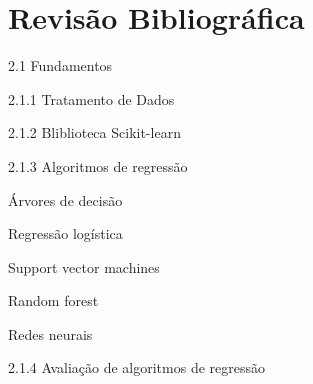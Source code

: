 

\chapter[Revisão Bibliográfica]{Revisão Bibliográfica}

2.1 Fundamentos\par
    
    2.1.1 Tratamento de Dados\par\par
	    2.1.2 Bliblioteca Scikit-learn\par\par
	    2.1.3 Algoritmos de regressão\par\par
		    Árvores de decisão\par
		    Regressão logística\par
		    Support vector machines\par
		    Random forest\par
		    Redes neurais\par
	2.1.4 Avaliação de algoritmos de regressão\par

		





